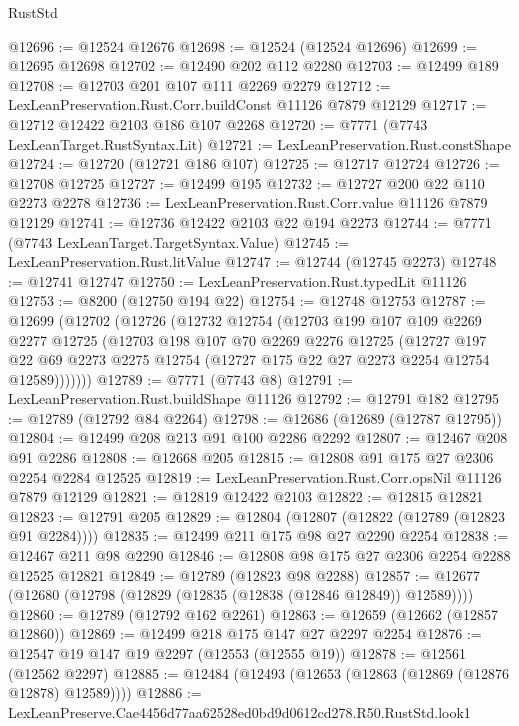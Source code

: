 \begin{lexlean}{RustStd}
\begin{coremodule}
@12696 := @12524 @12676
@12698 := @12524 (@12524 @12696)
@12699 := @12695 @12698
@12702 := @12490 @202 @112 @2280
@12703 := @12499 @189
@12708 := @12703 @201 @107 @111 @2269 @2279
@12712 := LexLeanPreservation.Rust.Corr.buildConst @11126 @7879 @12129
@12717 := @12712 @12422 @2103 @186 @107 @2268
@12720 := @7771 (@7743 LexLeanTarget.RustSyntax.Lit)
@12721 := LexLeanPreservation.Rust.constShape
@12724 := @12720 (@12721 @186 @107)
@12725 := @12717 @12724
@12726 := @12708 @12725
@12727 := @12499 @195
@12732 := @12727 @200 @22 @110 @2273 @2278
@12736 := LexLeanPreservation.Rust.Corr.value @11126 @7879 @12129
@12741 := @12736 @12422 @2103 @22 @194 @2273
@12744 := @7771 (@7743 LexLeanTarget.TargetSyntax.Value)
@12745 := LexLeanPreservation.Rust.litValue
@12747 := @12744 (@12745 @2273)
@12748 := @12741 @12747
@12750 := LexLeanPreservation.Rust.typedLit @11126
@12753 := @8200 (@12750 @194 @22)
@12754 := @12748 @12753
@12787 := @12699
    (@12702
      (@12726
        (@12732
          @12754
          (@12703
            @199
            @107
            @109
            @2269
            @2277
            @12725
            (@12703
              @198
              @107
              @70
              @2269
              @2276
              @12725
              (@12727
                @197
                @22
                @69
                @2273
                @2275
                @12754
                (@12727 @175 @22 @27 @2273 @2254 @12754 @12589)))))))
@12789 := @7771 (@7743 @8)
@12791 := LexLeanPreservation.Rust.buildShape @11126
@12792 := @12791 @182
@12795 := @12789 (@12792 @84 @2264)
@12798 := @12686 (@12689 (@12787 @12795))
@12804 := @12499 @208 @213 @91 @100 @2286 @2292
@12807 := @12467 @208 @91 @2286
@12808 := @12668 @205
@12815 := @12808 @91 @175 @27 @2306 @2254 @2284 @12525
@12819 := LexLeanPreservation.Rust.Corr.opsNil @11126 @7879 @12129
@12821 := @12819 @12422 @2103
@12822 := @12815 @12821
@12823 := @12791 @205
@12829 := @12804 (@12807 (@12822 (@12789 (@12823 @91 @2284))))
@12835 := @12499 @211 @175 @98 @27 @2290 @2254
@12838 := @12467 @211 @98 @2290
@12846 := @12808 @98 @175 @27 @2306 @2254 @2288 @12525 @12821
@12849 := @12789 (@12823 @98 @2288)
@12857 := @12677 (@12680 (@12798 (@12829 (@12835 (@12838 (@12846 @12849)) @12589))))
@12860 := @12789 (@12792 @162 @2261)
@12863 := @12659 (@12662 (@12857 @12860))
@12869 := @12499 @218 @175 @147 @27 @2297 @2254
@12876 := @12547 @19 @147 @19 @2297 (@12553 (@12555 @19))
@12878 := @12561 (@12562 @2297)
@12885 := @12484 (@12493 (@12653 (@12863 (@12869 (@12876 @12878) @12589))))
@12886 := LexLeanPreserve.Cae4456d77aa62528ed0bd9d0612cd278.R50.RustStd.look1

\end{coremodule}
\end{lexlean}
